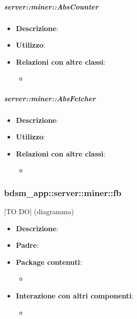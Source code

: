 		\subparagraph{server::miner::AbsCounter} %
		\label{subp:server_miner_AbsCounter}
			\begin{itemize}
				\item \textbf{Descrizione}: 
				\item \textbf{Utilizzo}: 
				\item \textbf{Relazioni con altre classi}:
					\begin{itemize}
						\item 
					\end{itemize}
			\end{itemize}
		
		\subparagraph{server::miner::AbsFetcher} %
		\label{subp:server_miner_AbsFetcher}
			\begin{itemize}
				\item \textbf{Descrizione}: 
				\item \textbf{Utilizzo}: 
				\item \textbf{Relazioni con altre classi}:
					\begin{itemize}
						\item 
					\end{itemize}
			\end{itemize}
		
\subsubsection{bdsm\_app::server::miner::fb} %
\label{ssub:bdsm_app_server_miner_fb}
[TO DO] (diagramma) \newline \newline

\begin{itemize}
  \item \textbf{Descrizione}:
  \item \textbf{Padre}:
  \item \textbf{Package contenuti}:
  	\begin{itemize}
  		\item
  	\end{itemize}
  \item \textbf{Interazione con altri componenti}:
  	\begin{itemize}
  		\item  	
  	\end{itemize}
\end{itemize}	

